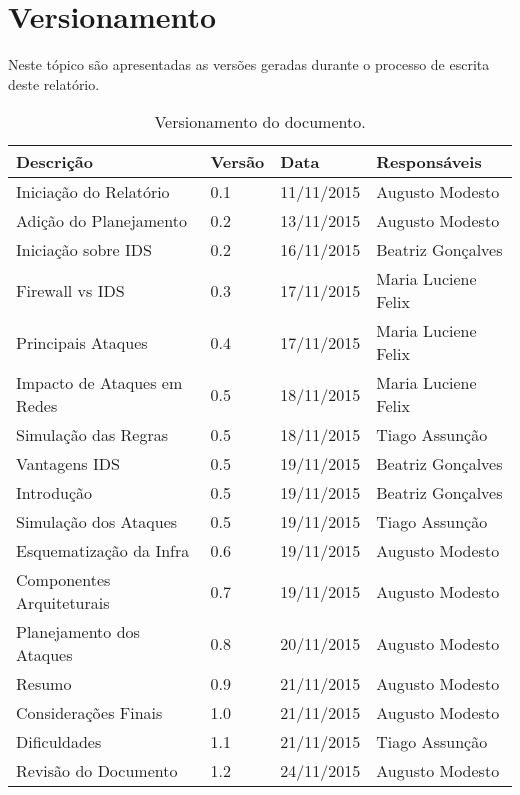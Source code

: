 \chapter[Versionamento]{Versionamento}
\label{chap:versionamento}
	Neste tópico são apresentadas as versões geradas durante o processo de escrita deste relatório.

	\label{subsubsec:versionamento_talbe}
		\begin{table}[h]
			\centering
			\begin{tabular}{|p{6cm}|p{1.5cm}|p{2.5cm}|p{4cm}|}

				\hline

				Descrição & Versão & Data & Responsáveis \\ \hline
				Iniciação do Relatório & 0.1 & 11/11/2015 & Augusto Modesto \\ \hline
				Adição do Planejamento & 0.2 & 13/11/2015 & Augusto Modesto \\ \hline
				Iniciação sobre IDS & 0.2 & 16/11/2015 & Beatriz Gonçalves \\ \hline
				Firewall vs IDS & 0.3 & 17/11/2015 & Maria Luciene Felix \\ \hline
				Principais Ataques & 0.4 & 17/11/2015 & Maria Luciene Felix \\ \hline
				Impacto de Ataques em Redes & 0.5 & 18/11/2015 & Maria Luciene Felix \\ \hline
				Simulação das Regras & 0.5 & 18/11/2015 & Tiago Assunção\\ \hline
				Vantagens IDS & 0.5 & 19/11/2015 & Beatriz Gonçalves \\ \hline
				Introdução & 0.5 & 19/11/2015 & Beatriz Gonçalves \\ \hline
				Simulação dos Ataques & 0.5 & 19/11/2015 & Tiago Assunção \\ \hline
				Esquematização da Infra & 0.6 & 19/11/2015 & Augusto Modesto \\ \hline
				Componentes Arquiteturais & 0.7 & 19/11/2015 & Augusto Modesto \\ \hline
				Planejamento dos Ataques & 0.8 & 20/11/2015 & Augusto Modesto \\ \hline
				Resumo & 0.9 & 21/11/2015 & Augusto Modesto \\ \hline
				Considerações Finais & 1.0 & 21/11/2015 & Augusto Modesto \\ \hline
				Dificuldades & 1.1 & 21/11/2015 & Tiago Assunção \\ \hline
				Revisão do Documento & 1.2 & 24/11/2015 & Augusto Modesto \\ \hline



			\end{tabular}
			\caption[Versionamento do Documento]{Versionamento do documento.}
			\label{tab:versionamento_tabl}
		\end{table}
